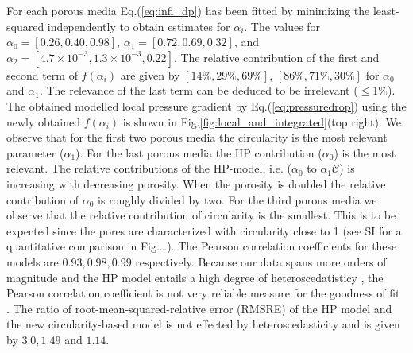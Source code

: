 \documentclass[draft]{agujournal2019}
\begin{document}
For each porous media Eq.(\ref{eq:infi_dp}) has been fitted by minimizing the least-squared independently to obtain estimates for $\alpha_i$. The values for $\alpha_0 =[0.26,0.40,0.98]$, $\alpha_1 = [0.72,0.69,0.32]$, and $\alpha_2 = [4.7\times 10^{-3},1.3 \times 10^{-3},0.22]$. The relative contribution of the first and second term of $f(\alpha_i)$ are given by $[14\%,29\%,69\%]$, $[86\%,71\%,30\%]$ for $\alpha_0$ and $\alpha_1$. The relevance of the last term can be deduced to be irrelevant ($\leq1\%$). The obtained modelled local pressure gradient by Eq.(\ref{eq:pressuredrop}) using the newly obtained $f(\alpha_i)$ is shown in Fig.\ref{fig:local_and_integrated}(top right). We observe that for the first two porous media the circularity is the most relevant parameter ($\alpha_1$). For the last porous media the HP contribution ($\alpha_0$) is the most relevant. The relative contributions of the HP-model, i.e. ($\alpha_0$ to $\alpha_1\mathcal{C}$) is increasing with decreasing porosity. When the porosity is doubled the relative contribution of $\alpha_0$ is roughly divided by two. For the third porous media we observe that the relative contribution of circularity is the smallest. This is to be expected since the pores are characterized with circularity close to 1 (see SI for a quantitative comparison in Fig.\ldots). The Pearson correlation coefficients for these models are $0.93, 0.98, 0.99$ respectively. Because our data spans more orders of magnitude and the HP model entails a high degree of heteroscedatisticy , the Pearson correlation coefficient is not very reliable measure for the goodness of fit . The ratio of root-mean-squared-relative error (RMSRE) of the HP model and the new circularity-based model is not effected by heteroscedasticity and is given by $3.0, 1.49$ and $1.14$.


\end{document}
